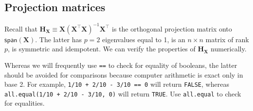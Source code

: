 \documentclass[]{book}
\newenvironment{Shaded}{\begin{snugshade}}{\end{snugshade}}
\newcommand{\KeywordTok}[1]{\textcolor[rgb]{0.13,0.29,0.53}{\textbf{#1}}}
\newcommand{\DecValTok}[1]{\textcolor[rgb]{0.00,0.00,0.81}{#1}}
\newcommand{\StringTok}[1]{\textcolor[rgb]{0.31,0.60,0.02}{#1}}
\newcommand{\CommentTok}[1]{\textcolor[rgb]{0.56,0.35,0.01}{\textit{#1}}}
\newcommand{\OperatorTok}[1]{\textcolor[rgb]{0.81,0.36,0.00}{\textbf{#1}}}
\newcommand{\NormalTok}[1]{#1}
\theoremstyle{definition}
\theoremstyle{definition}
\theoremstyle{definition}
\theoremstyle{remark}
\let\BeginKnitrBlock\begin \let\EndKnitrBlock\end
\begin{document}
\begin{Shaded}
\end{Shaded}

\subsection{Projection matrices}\label{projection-matrices}

Recall that
\(\mathbf{H}_{\mathbf{X}} \equiv \mathbf{X}(\mathbf{X}^\top\mathbf{X})^{-1}\mathbf{X}^\top\)
is the orthogonal projection matrix onto \(\mathsf{span}(\mathbf{X})\).
The latter has \(p=2\) eigenvalues equal to 1, is an \(n \times n\)
matrix of rank \(p\), is symmetric and idempotent. We can verify the
properties of \(\mathbf{H}_{\mathbf{X}}\) numerically.

\BeginKnitrBlock{rmdcaution}
Whereas we will frequently use \texttt{==} to check for equality of
booleans, the latter should be avoided for comparisons because computer
arithmetic is exact only in base 2. For example,
\texttt{1/10\ +\ 2/10\ -\ 3/10\ ==\ 0} will return \texttt{FALSE},
whereas \texttt{all.equal(1/10\ +\ 2/10\ -\ 3/10,\ 0)} will return
\texttt{TRUE}. Use \texttt{all.equal} to check for equalities.
\EndKnitrBlock{rmdcaution}

\begin{Shaded}
\end{Shaded}
\end{document}
